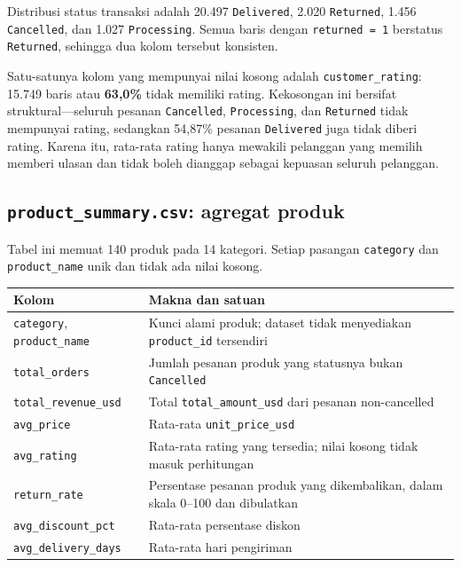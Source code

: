 \documentclass[
  indonesian,
  letterpaper,
  DIV=11,
  numbers=noendperiod]{scrreprt}
\newcounter{none} %
\begin{document}
Distribusi status transaksi adalah 20.497 \texttt{Delivered}, 2.020
\texttt{Returned}, 1.456 \texttt{Cancelled}, dan 1.027
\texttt{Processing}. Semua baris dengan \texttt{returned\ =\ 1}
berstatus \texttt{Returned}, sehingga dua kolom tersebut konsisten.

Satu-satunya kolom yang mempunyai nilai kosong adalah
\texttt{customer\_rating}: 15.749 baris atau \textbf{63,0\%} tidak
memiliki rating. Kekosongan ini bersifat struktural---seluruh pesanan
\texttt{Cancelled}, \texttt{Processing}, dan \texttt{Returned} tidak
mempunyai rating, sedangkan 54,87\% pesanan \texttt{Delivered} juga
tidak diberi rating. Karena itu, rata-rata rating hanya mewakili
pelanggan yang memilih memberi ulasan dan tidak boleh dianggap sebagai
kepuasan seluruh pelanggan.

\subsection*{\texorpdfstring{\texttt{product\_summary.csv}: agregat
produk}{product\_summary.csv: agregat produk}}\label{product_summary.csv-agregat-produk}

Tabel ini memuat 140 produk pada 14 kategori. Setiap pasangan
\texttt{category} dan \texttt{product\_name} unik dan tidak ada nilai
kosong.

{\def\LTcaptype{none} %
\begin{longtable}[]{@{}
  >{\raggedright\arraybackslash}p{}
  >{\raggedright\arraybackslash}p{}@{}}
\toprule\noalign{}
\begin{minipage}[b]{\linewidth}\raggedright
Kolom
\end{minipage} & \begin{minipage}[b]{\linewidth}\raggedright
Makna dan satuan
\end{minipage} \\
\midrule\noalign{}
\endhead
\bottomrule\noalign{}
\endlastfoot
\texttt{category}, \texttt{product\_name} & Kunci alami produk; dataset
tidak menyediakan \texttt{product\_id} tersendiri \\
\texttt{total\_orders} & Jumlah pesanan produk yang statusnya bukan
\texttt{Cancelled} \\
\texttt{total\_revenue\_usd} & Total \texttt{total\_amount\_usd} dari
pesanan non-cancelled \\
\texttt{avg\_price} & Rata-rata \texttt{unit\_price\_usd} \\
\texttt{avg\_rating} & Rata-rata rating yang tersedia; nilai kosong
tidak masuk perhitungan \\
\texttt{return\_rate} & Persentase pesanan produk yang dikembalikan,
dalam skala 0--100 dan dibulatkan \\
\texttt{avg\_discount\_pct} & Rata-rata persentase diskon \\
\texttt{avg\_delivery\_days} & Rata-rata hari pengiriman \\
\end{longtable}
}
\end{document}
